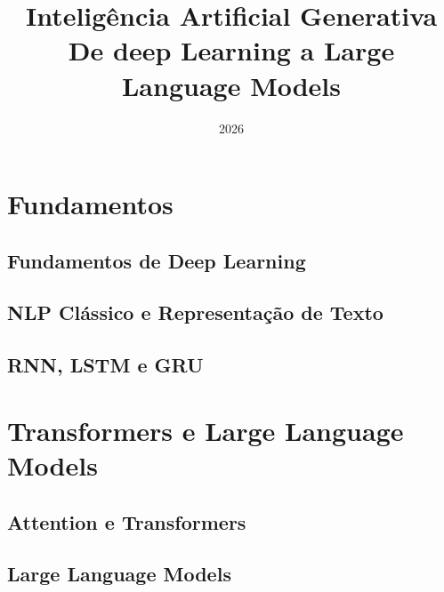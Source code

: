 \documentclass[11pt]{report}
\begin{document}
\title{Inteligência Artificial Generativa\\ De deep Learning a Large Language Models}
\author{}
\date{2026}
\maketitle

\tableofcontents


\part{Fundamentos}

\chapter{Fundamentos de Deep Learning}


\chapter{NLP Clássico e Representação de Texto}


\chapter{RNN, LSTM e GRU}



\part{Transformers e Large Language Models}

\chapter{Attention e Transformers}


\chapter{Large Language Models}


\end{document}

